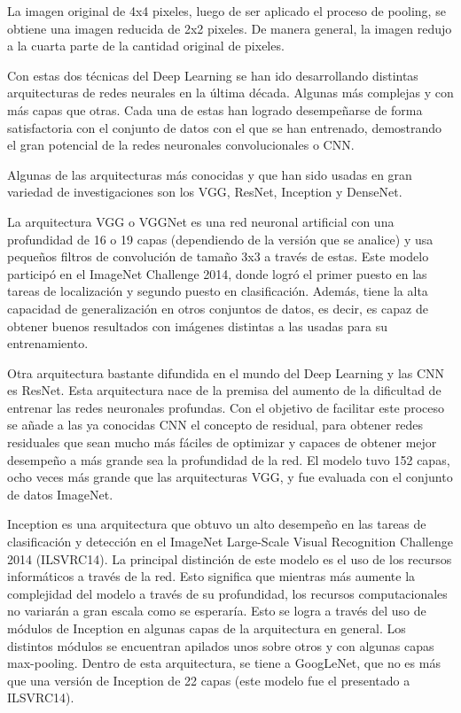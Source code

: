 La imagen original de 4x4 pixeles, luego de ser aplicado el proceso de pooling, se obtiene una imagen reducida de 2x2 pixeles. De manera general, la imagen redujo a la cuarta parte de la cantidad original de pixeles.

Con estas dos técnicas del Deep Learning se han ido desarrollando distintas arquitecturas de redes neurales en la última década. Algunas más complejas y con más capas que otras. Cada una de estas han logrado desempeñarse de forma satisfactoria con el conjunto de datos con el que se han entrenado, demostrando el gran potencial de la redes neuronales convolucionales o CNN.

Algunas de las arquitecturas más conocidas y que han sido usadas en gran variedad de investigaciones son los VGG, ResNet, Inception y DenseNet.

La arquitectura VGG o VGGNet es una red neuronal artificial con una profundidad de 16 o 19 capas (dependiendo de la versión que se analice) y usa pequeños filtros de convolución de tamaño 3x3 a través de estas. Este modelo participó en el ImageNet Challenge 2014, donde logró el primer puesto en las tareas de localización y segundo puesto en clasificación. Además, tiene la alta capacidad de generalización en otros conjuntos de datos, es decir, es capaz de obtener buenos resultados con imágenes distintas a las usadas para su entrenamiento. \parencite{pr_simonyan2015vdcn}

Otra arquitectura bastante difundida en el mundo del Deep Learning y las CNN es ResNet. Esta arquitectura nace de la premisa del aumento de la dificultad de entrenar las redes neuronales profundas. Con el objetivo de facilitar este proceso se añade a las ya conocidas CNN el concepto de residual, para obtener redes residuales que sean mucho más fáciles de optimizar y capaces de obtener mejor desempeño a más grande sea la profundidad de la red. El modelo tuvo 152 capas, ocho veces más grande que las arquitecturas VGG, y fue evaluada con el conjunto de datos ImageNet. \parencite{pr_he2016deepres}

Inception es una arquitectura que obtuvo un alto desempeño en las tareas de clasificación y detección en el ImageNet Large-Scale Visual Recognition Challenge 2014 (ILSVRC14). La principal distinción de este modelo es el uso de los recursos informáticos a través de la red. Esto significa que mientras más aumente la complejidad del modelo a través de su profundidad, los recursos computacionales no variarán a gran escala como se esperaría. Esto se logra a través del uso de módulos de Inception en algunas capas de la arquitectura en general. Los distintos módulos se encuentran apilados unos sobre otros y con algunas capas max-pooling. Dentro de esta arquitectura, se tiene a GoogLeNet, que no es más que una versión de Inception de 22 capas (este modelo fue el presentado a ILSVRC14). \parencite{pr_szegedy2015goingdwc}

